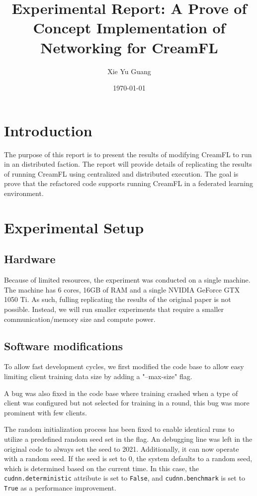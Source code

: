 \documentclass{article}
\title{Experimental Report: A Prove of Concept Implementation of Networking for CreamFL}
\author{Xie Yu Guang}
\date{\today}
\begin{document}
\maketitle

\section{Introduction}
The purpose of this report is to present the results of modifying CreamFL\cite{yu2023multimodal} to run in an distributed faction. The report will provide details of replicating the results of running CreamFL using centralized and distributed execution. The goal is prove that the refactored code supports running CreamFL in a federated learning environment. 

\section{Experimental Setup}

\subsection{Hardware}
Because of limited resources, the experiment was conducted on a single machine. The machine has 6 cores, 16GB of RAM and a single NVIDIA GeForce GTX 1050 Ti. As such, fulling replicating the results of the original paper is not possible. Instead, we will run smaller experiments that require a smaller communication/memory size and compute power.

\subsection{Software modifications}
To allow fast development cycles, we first modified the code base to allow easy limiting client training data size by adding a "--max-size" flag. 

A bug was also fixed in the code base where training crashed when a type of client was configured but not selected for training in a round, this bug was more prominent with few clients. 

The random initialization process has been fixed to enable identical runs to utilize a predefined random seed set in the flag. An debugging line was left in the original code to always set the seed to 2021. Additionally, it can now operate with a random seed. If the seed is set to 0, the system defaults to a random seed, which is determined based on the current time. In this case, the \texttt{cudnn.deterministic} attribute is set to \texttt{False}, and \texttt{cudnn.benchmark} is set to \texttt{True} as a performance improvement.
\end{document}
